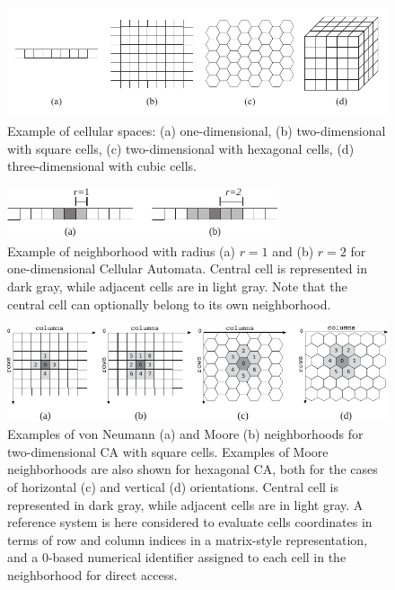 \begin{figure}
  \begin{center}
    \includegraphics[width=11.5cm]{./images/CellularAutomata/cellularspaces.pdf}
    \caption{Example of cellular spaces: (a) one-dimensional, (b)
      two-dimensional with square cells, (c) two-dimensional with
      hexagonal cells, (d) three-dimensional with cubic cells.}
    \label{fig:cellularspaces}
  \end{center}
\end{figure}

\begin{figure}
  \begin{center}
    \includegraphics[width=8cm]{./images/CellularAutomata/1Dneighborhoods.pdf}
    \caption{Example of neighborhood with radius (a) $r = 1$ and (b) $r
      = 2$ for one-dimensional Cellular Automata. Central cell is
      represented in dark gray, while adjacent cells are in light
      gray. Note that the central cell can optionally belong to its own
      neighborhood.}
    \label{fig:1Dneighborhood}
  \end{center}
\end{figure}

\begin{figure}
  \begin{center}
    \includegraphics[width=11.5cm]{./images/CellularAutomata/2Dneighborhoods.pdf}
    \caption{Examples of von Neumann (a) and Moore (b) neighborhoods
      for two-dimensional CA with square cells. Examples of Moore
      neighborhoods are also shown for hexagonal CA, both for the
      cases of horizontal (c) and vertical (d) orientations. Central
      cell is represented in dark gray, while adjacent cells are in
      light gray. A reference system is here considered to evaluate
      cells coordinates in terms of row and column indices in a
      matrix-style representation, and a 0-based numerical identifier
      assigned to each cell in the neighborhood for direct
      access.}
    \label{fig:2Dneighborhood}
  \end{center}
\end{figure}

